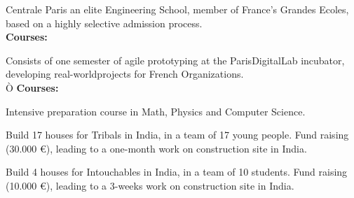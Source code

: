 



\small{Centrale Paris an elite Engineering School, member of France’s Grandes Ecoles, based on a highly selective admission process.\\}
{\textbf{Courses:}} \footnotesize{    }

\divider

\small{Consists of one semester of agile prototyping at the ParisDigitalLab incubator, developing real-worldprojects for French Organizations.\\Ò}%
{\textbf{Courses:}} \footnotesize{  }

\divider

\small{Intensive preparation course in Math, Physics and Computer Science.}

\divider





\small{Build 17 houses for Tribals in India, in a team of 17 young people.
Fund raising (30.000 €), leading to a one-month work on construction site in India.}

\divider


\small{Build 4 houses for Intouchables in India, in a team of 10 students.
Fund raising (10.000 €), leading to a 3-weeks work on construction site in India.}






